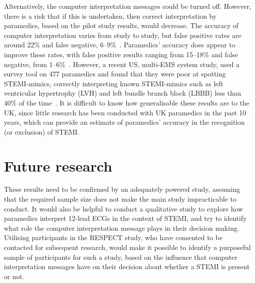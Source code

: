 Alternatively, the computer interpretation messages could be turned off. However, there is a risk that if this is undertaken, then correct interpretation by paramedics, based on the pilot study results, would decrease. The accuracy of computer interpretation varies from study to study, but false positive rates are around 22\% and false negative, 6--9\%~\citep{clark_automated_2010}. Paramedics' accuracy does appear to improve these rates, with false positive results ranging from 15--18\% and false negative, from 1--6\%~\citep{feldman_real-time_2005,trivedi_can_2009,le_may_citywide_2008}. However, a recent US, multi-EMS system study, used a survey tool on 477 paramedics and found that they were poor at spotting STEMI-mimics, correctly interpreting known STEMI-mimics such as left ventricular hypertrophy (LVH) and left bundle branch block (LBBB) less than 40\% of the time~\citep{mencl_paramedic_2013}. It is difficult to know how generalisable these results are to the UK, since little research has been conducted with UK paramedics in the past 10 years, which can provide an estimate of paramedics' accuracy in the recognition (or exclusion) of STEMI. 

\section{Future research}
\label{futureresearch}

These results need to be confirmed by an adequately powered study, assuming that the required sample size does not make the main study impracticable to conduct. It would also be helpful to conduct a qualitative study to explore how paramedics interpret 12-lead ECGs in the context of STEMI, and try to identify what role the computer interpretation message plays in their decision making. Utilising participants in the RESPECT study, who have consented to be contacted for subsequent research, would make it possible to identify a purposeful sample of participants for such a study, based on the influence that computer interpretation messages have on their decision about whether a STEMI is present or not.
